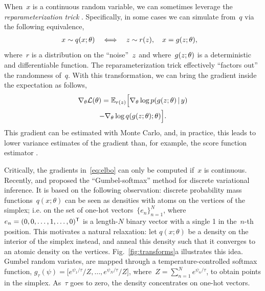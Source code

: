 \documentclass[twoside]{article}
\begin{document}
When~$x$ is a continuous random variable, we can sometimes leverage the \emph{reparameterization trick}
\citep{Salimans2013, Kingma2014}.  Specifically, in some cases we can
simulate from~$q$ via the following equivalence,
\begin{align*}
  x &\sim q(x; \theta)
      & \iff & &  
  z &\sim r(z), \quad x = g(z;\theta),
\end{align*}
where~$r$ is a distribution on the ``noise''~$z$ and
where~$g(z; \theta)$ is a deterministic and differentiable
function.
The reparameterization trick effectively ``factors out'' the randomness
of~$q$. With this transformation, we can bring the gradient inside the
expectation as follows,
\begin{multline}
  \label{eq:elbo}
  \nabla_\theta \mathcal{L}(\theta) 
  = \mathbb{E}_{r(z)} \Big[ \nabla_\theta \log p(g(z; \theta) \, | \, y) \\
    - \nabla_\theta  \log q(g(z; \theta); \theta) \Big].
\end{multline}
This gradient can be estimated with Monte Carlo, and, in practice,
this leads to lower variance estimates of the gradient than, for
example, the score function estimator \citep{Williams1992, Glynn1990}.

Critically, the gradients in~\eqref{eq:elbo} can only be computed
if~$x$ is continuous. Recently, \citet{maddison2016concrete} and
\citet{jang2016categorical} proposed the ``Gumbel-softmax'' method for
discrete variational inference. It is based on the following
observation: discrete probability mass functions~$q(x; \theta)$ can be
seen as densities with atoms on the vertices of the simplex; i.e. on
the set of one-hot vectors~${\{e_n\}_{n=1}^N}$,
where~${e_n = (0, 0, \ldots, 1, \ldots, 0)^{\mathsf{T}}}$ is a length-$N$ binary vector
with a single 1 in the~$n$-th position. This motivates a natural
relaxation: let $q(x; \theta)$ be a density on the interior of the
simplex instead, and anneal this density such that it converges to an
atomic density on the vertices. Fig.~\ref{fig:transforms}a illustrates
this idea. Gumbel random variates, are mapped through a
temperature-controlled softmax function,
${g_\tau(\psi) = \big[e^{\psi_1 / \tau}/Z, \ldots, e^{\psi_N / \tau}/Z
  \big]}$, where~${Z=\sum_{n=1}^N e^{\psi_n / \tau}}$, to obtain
points in the simplex. As~$\tau$ goes to zero, the density
concentrates on one-hot vectors.  %
\end{document}
